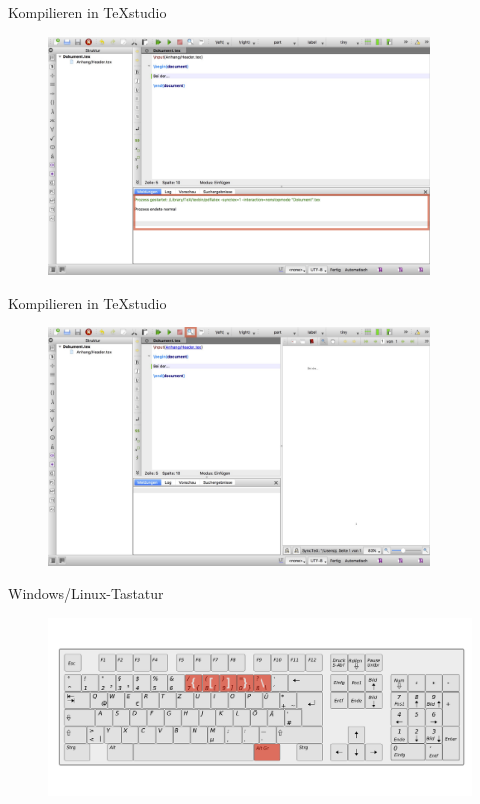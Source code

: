 \documentclass["WS\space 16-17\space -\space LaTeX-Kurs\space -\space Praesentation\space -\space 1.tex"]{subfiles}
\begin{document}
\begin{frame}[c]{Kompilieren in TeXstudio}
	\begin{figure}[htbp]
\centering
\includegraphics[width=0.9\textwidth]{img/editor/3.jpg}
\end{figure}
\end{frame}

\begin{frame}[c]{Kompilieren in TeXstudio}
	\begin{figure}[htbp]
\centering
\includegraphics[width=0.9\textwidth]{img/editor/4.jpg}
\end{figure}
\end{frame}

\begin{frame}[c]{Windows/Linux-Tastatur}
	\begin{figure}[htbp]
\centering
\includegraphics[width=1.0\textwidth]{img/tastatur/tastatur_win.png}
\end{figure}
\end{frame}
\end{document}
